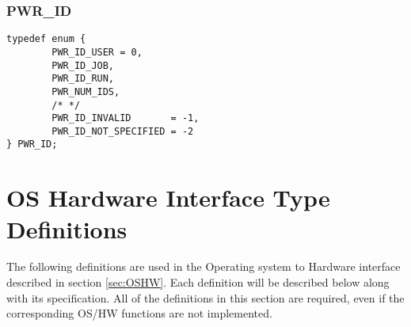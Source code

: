 


\subsubsection{PWR_ID}\label{type:ID}
\begin{center}
\begin{minipage}{.95\linewidth}%
\begin{lstlisting}
typedef enum {
        PWR_ID_USER = 0,
        PWR_ID_JOB,
        PWR_ID_RUN,
        PWR_NUM_IDS,
        /* */
        PWR_ID_INVALID       = -1,
        PWR_ID_NOT_SPECIFIED = -2
} PWR_ID;
\end{lstlisting}
\end{minipage}
\end{center}

\section{OS Hardware Interface Type Definitions}\label{sec:OSHWTypeDefinitions}
The following definitions are used in the Operating system to Hardware interface described in section \ref{sec:OSHW}.
Each definition will be described below along with its specification. All of the definitions in this section are required, even if the corresponding OS/HW functions are not implemented. 


